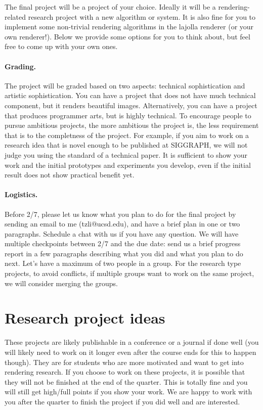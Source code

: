




The final project will be a project of your choice. Ideally it will be a rendering-related research project with a new algorithm or system. It is also fine for you to implement some non-trivial rendering algorithms in the lajolla renderer (or your own renderer!).
Below we provide some options for you to think about, but feel free to come up with your own ones.

\paragraph{Grading.} 
The project will be graded based on two aspects: technical sophistication and artistic sophistication.
You can have a project that does not have much technical component, but it renders beautiful images.
Alternatively, you can have a project that produces programmer arts, but is highly technical. 
To encourage people to pursue ambitious projects, the more ambitious the project is, the less requirement that is to the completness of the project. 
For example, if you aim to work on a research idea that is novel enough to be published at SIGGRAPH, we will not judge you using the standard of a technical paper.
It is sufficient to show your work and the initial prototypes and experiments you develop, even if the initial result does not show practical benefit yet.

\paragraph{Logistics.}
Before 2/7, please let us know what you plan to do for the final project by sending an email to me (tzli@ucsd.edu), and have a brief plan in one or two paragraphs.
Schedule a chat with us if you have any question. We will have multiple checkpoints between 2/7 and the due date: send us a brief progress report in a few paragraphs describing what you did and what you plan to do next.
Let's have a maximum of two people in a group. 
For the research type projects, to avoid conflicts, if multiple groups want to work on the same project, we will consider merging the groups. 

\section{Research project ideas}
These projects are likely publishable in a conference or a journal if done well (you will likely need to work on it longer even after the course ends for this to happen though).
They are for students who are more motivated and want to get into rendering research.
If you choose to work on these projects, it is possible that they will not be finished at the end of the quarter. This is totally fine and you will still get high/full points if you show your work.
We are happy to work with you after the quarter to finish the project if you did well and are interested.

